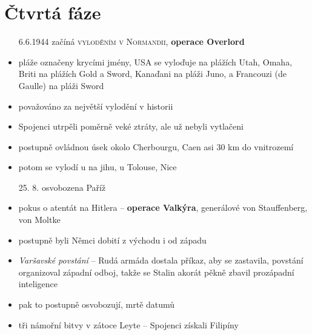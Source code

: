 \documentclass{article}
\begin{document}
\section*{Čtvrtá fáze}
\begin{itemize}
  \item[6.6.1944] začíná \textsc{vyloděním v Normandii}, \textbf{operace Overlord}
  \item pláže označeny krycími jmény, USA se vyloďuje na plážích Utah, Omaha, Briti na plážích Gold a Sword, Kanaďani na pláži Juno, a Francouzi (de Gaulle) na pláži Sword
  \item považováno za největší vylodění v historii
  \item Spojenci utrpěli poměrně veké ztráty, ale už nebyli vytlačeni
  \item postupně ovládnou úsek okolo Cherbourgu, Caen asi 30 km do vnitrozemí
  \item potom se vylodí u na jihu, u Tolouse, Nice
  \item[25. 8.] osvobozena Paříž
  \item pokus o atentát na Hitlera -- \textbf{operace Valkýra}, generálové von Stauffenberg, von Moltke
  \item postupně byli Němci dobití z východu i od západu
  \item \textit{Varšavské povstání} -- Rudá armáda dostala příkaz, aby se zastavila, povstání organizoval západní odboj, takže se Stalin akorát pěkně zbavil prozápadní inteligence
  \item pak to postupně osvobozují, mrtě datumů
  \item tři námořní bitvy v zátoce Leyte -- Spojenci získali Filipíny
\end{itemize}
\end{document}
